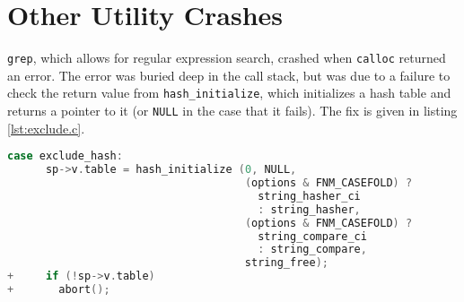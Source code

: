\section{Other Utility Crashes}
\label{appendix:other_gnu}

\texttt{grep}, which allows for regular expression search, crashed when \texttt{calloc} returned an error. The error was buried deep in the call stack, but was due to a failure to check the return value from \texttt{hash\_initialize}, which initializes a hash table and returns a pointer to it (or \texttt{NULL} in the case that it fails). The fix is given in listing \ref{lst:exclude.c}.

\begin{lstlisting}[label={lst:exclude.c},firstnumber=265, caption={\texttt{lib/exclude.c}.}, language=C]
	case exclude_hash:
	  sp->v.table = hash_initialize (0, NULL,
	                                 (options & FNM_CASEFOLD) ?
	                                   string_hasher_ci
	                                   : string_hasher,
	                                 (options & FNM_CASEFOLD) ?
	                                   string_compare_ci
	                                   : string_compare,
	                                 string_free);
+	  if (!sp->v.table)
+	    abort();
                                          
\end{lstlisting}